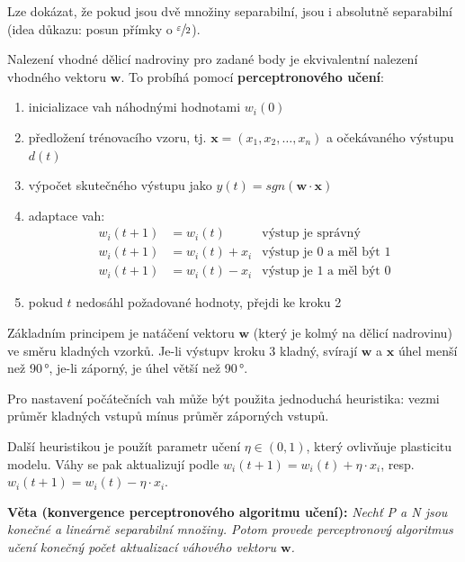 \documentclass[11pt]{report} %
\renewcommand{\vec}[1]{\mathbf{#1}}
\numberwithin{equation}{section}
\begin{document}
Lze dokázat, že pokud jsou dvě množiny separabilní, jsou i absolutně separabilní (idea důkazu: posun přímky o $\sfrac{\varepsilon}{2}$).

Nalezení vhodné dělicí nadroviny pro zadané body je ekvivalentní nalezení vhodného vektoru $\vec{w}$. To probíhá pomocí \textbf{perceptronového učení}:
\begin{enumerate}
	
	
	\item inicializace vah náhodnými hodnotami $w_i(0)$
	\item předložení trénovacího vzoru, tj. $\vec{x} = (x_1, x_2,\dots,x_n)$ a očekávaného výstupu $d(t)$
	\item výpočet skutečného výstupu jako $y(t) = sgn(\vec{w}\cdot\vec{x})$
	\item adaptace vah:
	\begin{align*}
		w_i(t+1)& = w_i(t)			& \text{výstup je správný}\\
		w_i(t+1)& = w_i(t) + x_i	& \text{výstup je 0 a měl být 1}\\
		w_i(t+1)& = w_i(t) - x_i	& \text{výstup je 1 a měl být 0}
	\end{align*}
	\item pokud $t$ nedosáhl požadované hodnoty, přejdi ke kroku 2
\end{enumerate}

Základním principem je natáčení vektoru $\vec{w}$ (který je kolmý na dělicí nadrovinu) ve směru kladných vzorků. Je-li výstupv kroku 3 kladný, svírají $\vec{w}$ a $\vec{x}$ úhel menší než 90\,°, je-li záporný, je úhel větší než 90\,°. 

Pro nastavení počátečních vah může být použita jednoduchá heuristika: vezmi průměr kladných vstupů mínus průměr záporných vstupů.

Další heuristikou je použít parametr učení $\eta \in (0,1)$, který ovlivňuje plasticitu modelu. Váhy se pak aktualizují podle $w_i(t+1) = w_i(t) + \eta\cdot x_i$, resp. $w_i(t+1) = w_i(t) - \eta\cdot x_i$.

\medskip\noindent\textbf{Věta (konvergence perceptronového algoritmu učení):} \textit{Nechť P a N jsou konečné a lineárně separabilní množiny. Potom provede perceptronový algoritmus učení konečný počet aktualizací váhového vektoru $\vec{w}$.}
\end{document}
